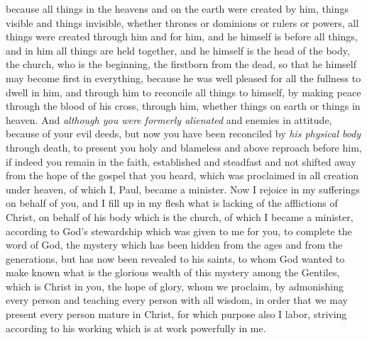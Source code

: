 \begin{biblechapter}
\verse because all things in the heavens and on the earth were created by him, things visible and things invisible, whether thrones or dominions or rulers or powers, all things were created through him and for him,
\verse and he himself is before all things, and in him all things are held together,
\verse and he himself is the head of the body, the church, who is the beginning, the firstborn from the dead, so that he himself may become first in everything,
\verse because he was well pleased for all the fullness to dwell in him,
\verse and through him to reconcile all things to himself, by making peace through the blood of his cross, through him, whether things on earth or things in heaven.
\verse And \textit{although you were formerly alienated} and enemies in attitude, because of your evil deeds,
\verse but now you have been reconciled by \textit{his physical body} through death, to present you holy and blameless and above reproach before him,
\verse if indeed you remain in the faith, established and steadfast and not shifted away from the hope of the gospel that you heard, which was proclaimed in all creation under heaven, of which I, Paul, became a minister.
 Now I rejoice in my sufferings on behalf of you, and I fill up in my flesh what is lacking of the afflictions of Christ, on behalf of his body which is the church,
\verse of which I became a minister, according to God’s stewardship which was given to me for you, to complete the word of God,
\verse the mystery which has been hidden from the ages and from the generations, but has now been revealed to his saints,
\verse to whom God wanted to make known what is the glorious wealth of this mystery among the Gentiles, which is Christ in you, the hope of glory,
\verse whom we proclaim, by admonishing every person and teaching every person with all wisdom, in order that we may present every person mature in Christ,
\verse for which purpose also I labor, striving according to his working which is at work powerfully in me.
\end{biblechapter}

